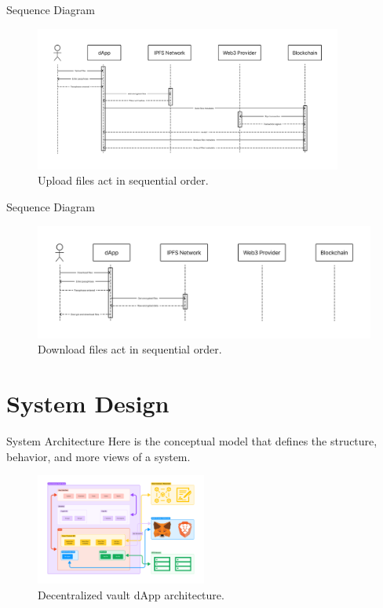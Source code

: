 \documentclass[aspectratio=169,usenames,dvipsnames,pdftex]{beamer}
\begin{document}
  \begin{frame}{Sequence Diagram}
    \begin{figure}
      \includegraphics[width=0.9\textwidth]{upload_files_seq_dig.png}
      \caption{Upload files act in sequential order.}
    \end{figure}
  \end{frame}

  \begin{frame}{Sequence Diagram}
    \begin{figure}
      \includegraphics[width=\textwidth]{download_files_seq_dig.png}
      \caption{Download files act in sequential order.}
    \end{figure}
  \end{frame}

  \section{System Design}

  \begin{frame}{System Architecture}
    Here is the conceptual model that defines the structure, behavior, and more views of a system.

    \begin{figure}
      \includegraphics[width=0.5\textwidth]{system_arch.pdf}
      \caption{Decentralized vault dApp architecture.}
    \end{figure}
  \end{frame}
\end{document}
